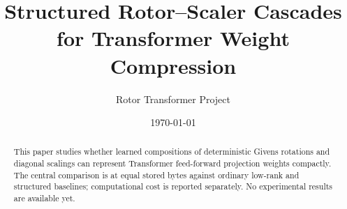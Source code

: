 \documentclass[11pt]{article}
\title{Structured Rotor--Scaler Cascades for Transformer Weight Compression}
\author{Rotor Transformer Project}
\date{\today}
\begin{document}
\maketitle
\begin{abstract}
This paper studies whether learned compositions of deterministic Givens rotations and diagonal scalings can represent Transformer feed-forward projection weights compactly. The central comparison is at equal stored bytes against ordinary low-rank and structured baselines; computational cost is reported separately. No experimental results are available yet.
\end{abstract}






\appendix


\end{document}
